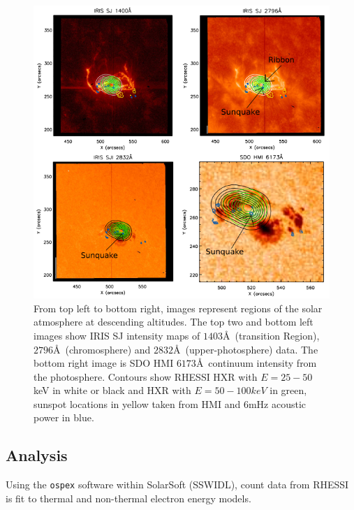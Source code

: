 \begin{figure}[H]
  \begin{center}
  \includegraphics[width=1.0\textwidth]{saxcontours-square}
  \end{center}
  \caption{From top left to bottom right, images represent regions of the solar atmosphere at descending altitudes. The top two and bottom left images show IRIS SJ intensity maps of $1403$\AA\ (transition Region), $2796$\AA\ (chromosphere) and $2832$\AA\ (upper-photosphere) data. The bottom right image is SDO HMI $6173$\AA\ continuum intensity from the photosphere. Contours show RHESSI HXR with $E = 25-50$ keV in white or black and HXR with $E = 50-100 keV$ in green, sunspot locations in yellow taken from HMI and 6mHz acoustic power in blue.}\label{saxcontours-vert}
\end{figure}


\subsection{Analysis}


Using the \texttt{ospex} software within SolarSoft (SSWIDL), count data from RHESSI is fit to thermal and non-thermal electron energy models. %


